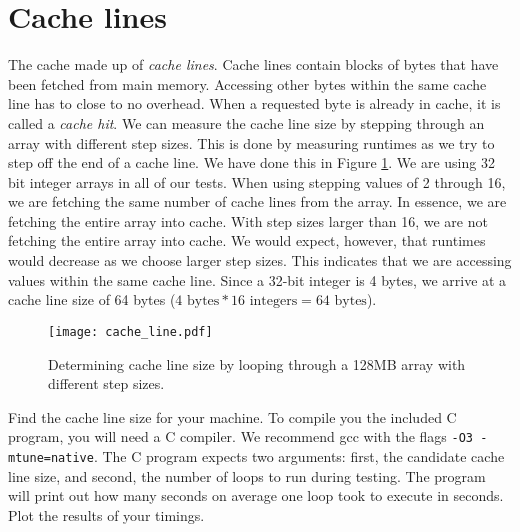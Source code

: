 \section*{Cache lines}
The cache made up of \emph{cache lines}.
Cache lines contain blocks of bytes that have been fetched from main memory.
Accessing other bytes within the same cache line has to close to no overhead.
When a requested byte is already in cache, it is called a \emph{cache hit}.
We can measure the cache line size by stepping through an array with different step sizes.
This is done by measuring runtimes as we try to step off the end of a cache line.
We have done this in Figure \ref{fig:linesize}.  We are using 32 bit integer arrays in all of our tests.
When using stepping values of 2 through 16, we are fetching the same number of cache lines from the array.
In essence, we are fetching the entire array into cache.
With step sizes larger than 16, we are not fetching the entire array into cache.
We would expect, however, that runtimes would decrease as we choose larger step sizes.
This indicates that we are accessing values within the same cache line.
Since a 32-bit integer is 4 bytes, we arrive at a cache line size of 64 bytes ($4 \mbox{~bytes} * 16 \mbox{~integers} = 64 \mbox{~bytes}$).
\begin{figure}[h]
\centering
\texttt{[image: cache\_line.pdf]}
\caption{Determining cache line size by looping through a 128MB array with different step sizes.}
\label{fig:linesize}
\end{figure}

\begin{problem}
Find the cache line size for your machine.
To compile you the included C program, you will need a C compiler.
We recommend gcc with the flags \texttt{-O3 -mtune=native}.
The C program expects two arguments: first, the candidate cache line size, and second, the number of loops to run during testing.
The program will print out how many seconds on average one loop took to execute in seconds.
Plot the results of your timings.
\label{prob:cacheline}
\end{problem}

